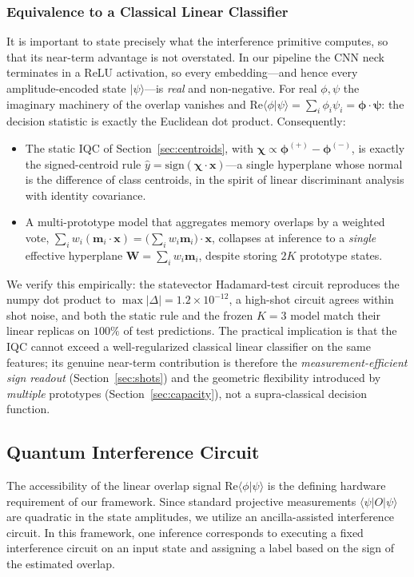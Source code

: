 \documentclass[conference]{IEEEtran}
\begin{document}
\subsubsection{Equivalence to a Classical Linear Classifier}
\label{sec:equivalence}
It is important to state precisely what the interference primitive computes, so that its near-term advantage is not overstated. In our pipeline the CNN neck terminates in a ReLU activation, so every embedding---and hence every amplitude-encoded state $|\psi\rangle$---is \emph{real} and non-negative. For real $\phi,\psi$ the imaginary machinery of the overlap vanishes and $\mathrm{Re}\langle\phi|\psi\rangle = \sum_i \phi_i\psi_i = \bm{\phi}\cdot\bm{\psi}$: the decision statistic is exactly the Euclidean dot product. Consequently:
\begin{itemize}
    \item The static IQC of Section~\ref{sec:centroids}, with $\bm{\chi}\propto\bm{\phi}^{(+)}-\bm{\phi}^{(-)}$, is exactly the signed-centroid rule $\hat{y}=\mathrm{sign}(\bm{\chi}\cdot\bm{x})$---a single hyperplane whose normal is the difference of class centroids, in the spirit of linear discriminant analysis with identity covariance.
    \item A multi-prototype model that aggregates memory overlaps by a weighted vote, $\sum_i w_i(\bm{m}_i\cdot\bm{x}) = \big(\sum_i w_i\bm{m}_i\big)\cdot\bm{x}$, collapses at inference to a \emph{single} effective hyperplane $\bm{W}=\sum_i w_i\bm{m}_i$, despite storing $2K$ prototype states.
\end{itemize}
We verify this empirically: the statevector Hadamard-test circuit reproduces the numpy dot product to $\max|\Delta|=1.2\times10^{-12}$, a high-shot circuit agrees within shot noise, and both the static rule and the frozen $K{=}3$ model match their linear replicas on $100\%$ of test predictions. The practical implication is that the IQC cannot exceed a well-regularized classical linear classifier on the same features; its genuine near-term contribution is therefore the \emph{measurement-efficient sign readout} (Section~\ref{sec:shots}) and the geometric flexibility introduced by \emph{multiple} prototypes (Section~\ref{sec:capacity}), not a supra-classical decision function.

\subsection{Quantum Interference Circuit}
The accessibility of the linear overlap signal $\mathrm{Re}\langle \phi | \psi \rangle$ is the defining hardware requirement of our framework. Since standard projective measurements $\langle \psi | O | \psi \rangle$ are quadratic in the state amplitudes, we utilize an ancilla-assisted interference circuit. In this framework, one inference corresponds to executing a fixed interference circuit on an input state and assigning a label based on the sign of the estimated overlap.
\end{document}
